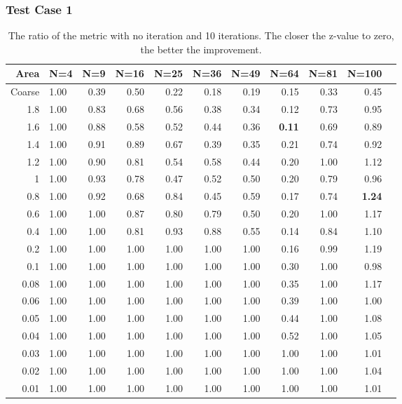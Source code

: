 \documentclass[]{beamer}
\begin{document}
\begin{frame}\frametitle{Test Case 1}
\begin{table}[H]
\tiny
\centering
\caption{The ratio  of the metric with no iteration and 10 iterations. The closer the z-value to zero, the better the improvement.} 
\begin{tabular}{rlrrrrrrrrr}
  \hline
 Area & N=4 & N=9 & N=16 & N=25 & N=36 & N=49 & N=64 & N=81 & N=100 \\ 
  \hline
 Coarse & 1.00 & 0.39 & 0.50 & 0.22 & 0.18 & 0.19 & 0.15 & 0.33 & 0.45 \\ 
   1.8 & 1.00 & 0.83 & 0.68 & 0.56 & 0.38 & 0.34 & 0.12 & 0.73 & 0.95 \\ 
   1.6 & 1.00 & 0.88 & 0.58 & 0.52 & 0.44 & 0.36 & \textbf{\cellcolor{blue!25}0.11} & 0.69 & 0.89 \\ 
  1.4 & 1.00 & 0.91 & 0.89 & 0.67 & 0.39 & 0.35 & 0.21 & 0.74 & 0.92 \\ 
   1.2 & 1.00 & 0.90 & 0.81 & 0.54 & 0.58 & 0.44 & 0.20 & 1.00 & 1.12 \\ 
   1 & 1.00 & 0.93 & 0.78 & 0.47 & 0.52 & 0.50 & 0.20 & 0.79 & 0.96 \\ 
0.8 & 1.00 & 0.92 & 0.68 & 0.84 & 0.45 & 0.59 & 0.17 & 0.74 & \textbf{\cellcolor{blue!25}1.24} \\ 
  0.6 & 1.00 & 1.00 & 0.87 & 0.80 & 0.79 & 0.50 & 0.20 & 1.00 & 1.17 \\ 
 0.4 & 1.00 & 1.00 & 0.81 & 0.93 & 0.88 & 0.55 & 0.14 & 0.84 & 1.10 \\ 
  0.2 & 1.00 & 1.00 & 1.00 & 1.00 & 1.00 & 1.00 & 0.16 & 0.99 & 1.19 \\ 
  0.1 & 1.00 & 1.00 & 1.00 & 1.00 & 1.00 & 1.00 & 0.30 & 1.00 & 0.98 \\ 
   0.08 & 1.00 & 1.00 & 1.00 & 1.00 & 1.00 & 1.00 & 0.35 & 1.00 & 1.17 \\ 
   0.06 & 1.00 & 1.00 & 1.00 & 1.00 & 1.00 & 1.00 & 0.39 & 1.00 & 1.00 \\ 
   0.05 & 1.00 & 1.00 & 1.00 & 1.00 & 1.00 & 1.00 & 0.44 & 1.00 & 1.08 \\ 
   0.04 & 1.00 & 1.00 & 1.00 & 1.00 & 1.00 & 1.00 & 0.52 & 1.00 & 1.05 \\ 
   0.03 & 1.00 & 1.00 & 1.00 & 1.00 & 1.00 & 1.00 & 1.00 & 1.00 & 1.01 \\ 
  0.02 & 1.00 & 1.00 & 1.00 & 1.00 & 1.00 & 1.00 & 1.00 & 1.00 & 1.04 \\ 
   0.01 & 1.00 & 1.00 & 1.00 & 1.00 & 1.00 & 1.00 & 1.00 & 1.00 & 1.01 \\ 
   \hline
\end{tabular}
\end{table}
\end{frame}
\end{document}
